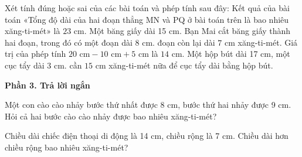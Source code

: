 \begin{ex} %
Xét tính đúng hoặc sai của các bài toán và phép tính sau đây:
\choiceTF
{\True Kết quả của bài toán «Tổng độ dài của hai đoạn thẳng MN và PQ ở bài toán trên là bao nhiêu xăng-ti-mét» là $23\text{ cm}$.}
{\True Một băng giấy dài 15 cm. Bạn Mai cắt băng giấy thành hai đoạn, trong đó có một đoạn dài 8 cm. đoạn còn lại dài $7\text{ cm}$ xăng-ti-mét.}
{Giá trị của phép tính $20\text{ cm} - 10\text{ cm} + 5\text{ cm}$ là $14\text{ cm}$.}
{Một hộp bút dài 17 cm, một cục tẩy dài 3 cm. cần $15\text{ cm}$ xăng-ti-mét nữa để cục tẩy dài bằng hộp bút.}
\end{ex}

\textbf{Phần 3. Trả lời ngắn}

\begin{ex} %
Một con cào cào nhảy bước thứ nhất được 8 cm, bước thứ hai nhảy được 9 cm. Hỏi cả hai bước cào cào nhảy được bao nhiêu xăng-ti-mét?
\end{ex}

\begin{ex} %
Chiều dài chiếc điện thoại di động là 14 cm, chiều rộng là 7 cm. Chiều dài hơn chiều rộng bao nhiêu xăng-ti-mét?
\end{ex}

